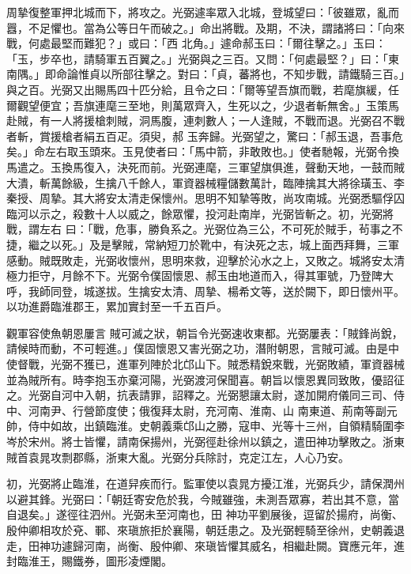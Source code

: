 \begin{pinyinscope}
 周摯復整軍押北城而下，將攻之。光弼遽率眾入北城，登城望曰：「彼雖眾，亂而囂，不足懼也。當為公等日午而破之。」命出將戰。及期，不決，謂諸將曰：「向來戰，何處最堅而難犯？」或曰：「西
 北角。」遽命郝玉曰：「爾往擊之。」玉曰：「玉，步卒也，請騎軍五百翼之。」光弼與之三百。又問：「何處最堅？」曰：「東南隅。」即命論惟貞以所部往擊之。對曰：「貞，蕃將也，不知步戰，請鐵騎三百。」與之百。光弼又出賜馬四十匹分給，且令之曰：「爾等望吾旗而戰，若麾旗緩，任爾觀望便宜；吾旗連麾三至地，則萬眾齊入，生死以之，少退者斬無舍。」玉策馬赴賊，有一人將援槍刺賊，洞馬腹，連刺數人；一人逢賊，不戰而退。光弼召不戰者斬，賞援槍者絹五百疋。須臾，郝
 玉奔歸。光弼望之，驚曰：「郝玉退，吾事危矣。」命左右取玉頭來。玉見使者曰：「馬中箭，非敢敗也。」使者馳報，光弼令換馬遣之。玉換馬復入，決死而前。光弼連麾，三軍望旗俱進，聲動天地，一鼓而賊大潰，斬萬餘級，生擒八千餘人，軍資器械糧儲數萬計，臨陣擒其大將徐璜玉、李秦授、周摯。其大將安太清走保懷州。思明不知摯等敗，尚攻南城。光弼悉驅俘囚臨河以示之，殺數十人以威之，餘眾懼，投河赴南岸，光弼皆斬之。初，光弼將戰，謂左右
 曰：「戰，危事，勝負系之。光弼位為三公，不可死於賊手，茍事之不捷，繼之以死。」及是擊賊，常納短刀於靴中，有決死之志，城上面西拜舞，三軍感動。賊既敗走，光弼收懷州，思明來救，迎擊於沁水之上，又敗之。城將安太清極力拒守，月餘不下。光弼令僕固懷恩、郝玉由地道而入，得其軍號，乃登陴大呼，我師同登，城遂拔。生擒安太清、周摯、楊希文等，送於闕下，即日懷州平。以功進爵臨淮郡王，累加實封至一千五百戶。



 觀軍容使魚朝恩屢言
 賊可滅之狀，朝旨令光弼速收東都。光弼屢表：「賊鋒尚銳，請候時而動，不可輕進。」僕固懷恩又害光弼之功，潛附朝恩，言賊可滅。由是中使督戰，光弼不獲已，進軍列陣於北邙山下。賊悉精銳來戰，光弼敗績，軍資器械並為賊所有。時李抱玉亦棄河陽，光弼渡河保聞喜。朝旨以懷恩異同致敗，優詔征之。光弼自河中入朝，抗表請罪，詔釋之。光弼懇讓太尉，遂加開府儀同三司、侍中、河南尹、行營節度使；俄復拜太尉，充河南、淮南、山
 南東道、荊南等副元帥，侍中如故，出鎮臨淮。史朝義乘邙山之勝，寇申、光等十三州，自領精騎圍李岑於宋州。將士皆懼，請南保揚州，光弼徑赴徐州以鎮之，遣田神功擊敗之。浙東賊首袁晁攻剽郡縣，浙東大亂。光弼分兵除討，克定江左，人心乃安。



 初，光弼將止臨淮，在道舁疾而行。監軍使以袁晁方擾江淮，光弼兵少，請保潤州以避其鋒。光弼曰：「朝廷寄安危於我，今賊雖強，未測吾眾寡，若出其不意，當自退矣。」遂徑往泗州。光弼未至河南也，田
 神功平劉展後，逗留於揚府，尚衡、殷仲卿相攻於兗、鄆、來瑱旅拒於襄陽，朝廷患之。及光弼輕騎至徐州，史朝義退走，田神功遽歸河南，尚衡、殷仲卿、來瑱皆懼其威名，相繼赴闕。寶應元年，進封臨淮王，賜鐵券，圖形凌煙閣。




\end{pinyinscope}
